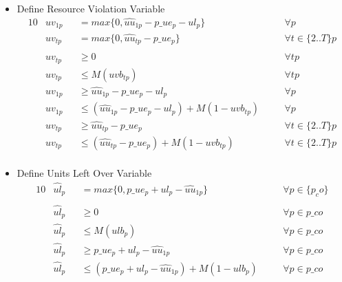\begin{itemize}
	\item Define Resource Violation Variable
	\begin{alignat}{10}
		& uv_{1p} 
			&& = max\{0 , \hat{uu}_{1p} - p\_ue_{p} - ul_{p}\} \quad 
			&& \forall p \\ 
		& uv_{tp} 
			&& = max\{0 , \hat{uu}_{tp} - p\_ue_{p}\} \quad
			&& \forall t \in \{2..T\} p \\ \\
		& uv_{tp} 
			&&\ge 0 \quad
			&& \forall tp \\
		& uv_{tp} 
			&& \le  M(uvb_{tp}) \quad
			&& \forall tp \\
		& uv_{1p} 
			&&\ge \hat{uu}_{1p} - p\_ue_{p} - ul_{p} \quad
			&& \forall p \\
		& uv_{1p} 
		&& \le  (\hat{uu}_{1p} - p\_ue_{p} - ul_{p}) + M(1-uvb_{tp}) \quad
		&& \forall p \\
		& uv_{tp} 
			&&\ge \hat{uu}_{tp} - p\_ue_{p} \quad
			&& \forall t \in \{2..T \} p \\
		& uv_{tp} 
		&& \le  (\hat{uu}_{tp} - p\_ue_{p}) + M(1-uvb_{tp}) \quad
		&& \forall t \in \{ 2..T \} p \\
	\end{alignat}
	
	\item Define Units Left Over Variable
	\begin{alignat}{10}
		& \hat{ul}_{p} 
			&& = max \{0, p\_ue_{p} + ul_{p} - \hat{uu}_{1p} \}
			&& \forall p \in \{p_co\} \\ \\
		& \hat{ul}_{p} 
			&& \ge 0 \quad 
			&& \forall p  \in p\_co \\
		& \hat{ul}_{p} 
			&& \le M (ulb_{p}) \quad 
			&& \forall p  \in p\_co\\
		& \hat{ul}_{p} 
			&& \ge p\_ue_{p} + ul_{p} - \hat{uu}_{1p} \quad 
			&& \forall p  \in p\_co\\
		& \hat{ul}_{p} 
			&& \le (p\_ue_{p} + ul_{p} - \hat{uu}_{1p}) + M(1-ulb_{p}) \quad 
			&& \forall p  \in p\_co
	\end{alignat}
	

\end{itemize}
